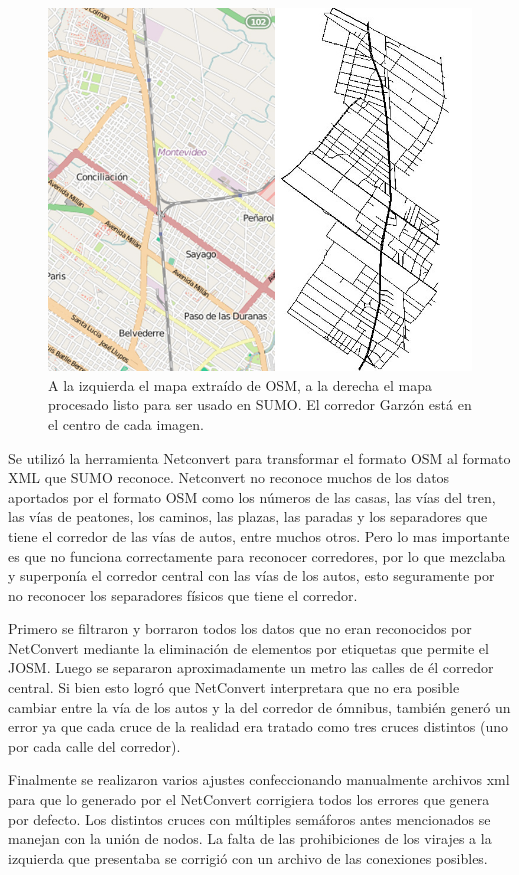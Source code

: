 \begin{figure}[H]
	\centering
	\includegraphics[width=0.9\linewidth]{Figures/mapa_osm_sumo}
	\caption{A la izquierda el mapa extraído de OSM, a la derecha el mapa procesado listo para ser usado en SUMO. El corredor Garzón está en el centro de cada imagen.}
	\label{fig:mapa_osm_sumo}
\end{figure}

Se utilizó la herramienta Netconvert para transformar el formato OSM al formato XML que SUMO reconoce. Netconvert no reconoce muchos de los datos aportados por el formato OSM como los números de las casas, las vías del tren, las vías de peatones, los caminos, las plazas, las paradas y los separadores que tiene el corredor de las vías de autos, entre muchos otros. Pero lo mas importante es que no funciona correctamente para reconocer corredores, por lo que mezclaba y superponía el corredor central con las vías de los autos, esto seguramente por no reconocer los separadores físicos que tiene el corredor. 

Primero se filtraron y borraron todos los datos que no eran reconocidos por NetConvert mediante la eliminación de elementos por etiquetas que permite el 
JOSM. Luego se separaron aproximadamente un metro las calles de él corredor central. Si bien esto logró que NetConvert interpretara que no era posible cambiar entre la vía de los autos y la del corredor de ómnibus, también generó un error ya que cada cruce de la realidad era tratado como tres cruces distintos (uno por cada calle del corredor).

Finalmente se realizaron varios ajustes confeccionando manualmente archivos xml para que lo generado por el NetConvert corrigiera todos los errores que genera por defecto. Los distintos cruces con múltiples semáforos antes mencionados se manejan con la unión de nodos. La falta de las prohibiciones de los virajes a la izquierda que presentaba se corrigió con un archivo de las conexiones posibles.

